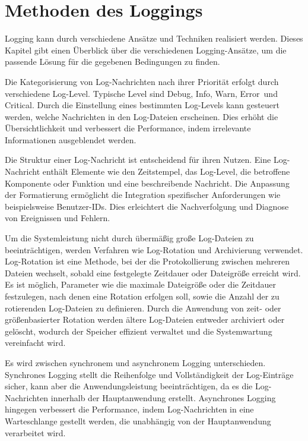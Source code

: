 \section{Methoden des Loggings}

Logging kann durch verschiedene Ansätze und Techniken realisiert werden. Dieses Kapitel gibt
einen Überblick über die verschiedenen Logging-Ansätze, um die passende Lösung für die gegebenen Bedingungen zu finden.

Die Kategorisierung von Log-Nachrichten nach ihrer Priorität erfolgt durch verschiedene Log-Level. Typische Level sind \glqq Debug\grqq, \glqq Info\grqq, \glqq Warn\grqq, \glqq Error\grqq\ und \glqq Critical\grqq. 
Durch die Einstellung eines bestimmten Log-Levels kann gesteuert werden, welche Nachrichten in den Log-Dateien erscheinen. Dies erhöht die Übersichtlichkeit und 
verbessert die Performance, indem irrelevante Informationen ausgeblendet werden.

Die Struktur einer Log-Nachricht ist entscheidend für ihren Nutzen. Eine Log-Nachricht enthält Elemente wie den Zeitstempel, das Log-Level, die betroffene Komponente 
oder Funktion und eine beschreibende Nachricht. Die Anpassung der Formatierung ermöglicht die Integration spezifischer Anforderungen wie beispielsweise Benutzer-IDs. Dies 
erleichtert die Nachverfolgung und Diagnose von Ereignissen und Fehlern.

Um die Systemleistung nicht durch übermäßig große Log-Dateien zu beeinträchtigen, werden Verfahren wie Log-Rotation und Archivierung verwendet. Log-Rotation ist eine Methode, 
bei der die Protokollierung zwischen mehreren Dateien wechselt, sobald eine festgelegte Zeitdauer oder Dateigröße erreicht wird. Es ist möglich, Parameter wie die 
maximale Dateigröße oder die Zeitdauer festzulegen, nach denen eine Rotation erfolgen soll, sowie die Anzahl der zu rotierenden Log-Dateien zu definieren. Durch die Anwendung 
von zeit- oder größenbasierter Rotation werden ältere Log-Dateien entweder archiviert oder gelöscht, wodurch der Speicher effizient verwaltet und die 
Systemwartung vereinfacht wird.

Es wird zwischen synchronem und asynchronem Logging unterschieden. Synchrones Logging stellt die Reihenfolge und Vollständigkeit der Log-Einträge sicher, kann aber die 
Anwendungsleistung beeinträchtigen, da es die Log-Nachrichten innerhalb der Hauptanwendung erstellt. Asynchrones Logging hingegen verbessert die Performance, indem Log-Nachrichten 
in eine Warteschlange gestellt werden, die unabhängig von der Hauptanwendung verarbeitet wird.

